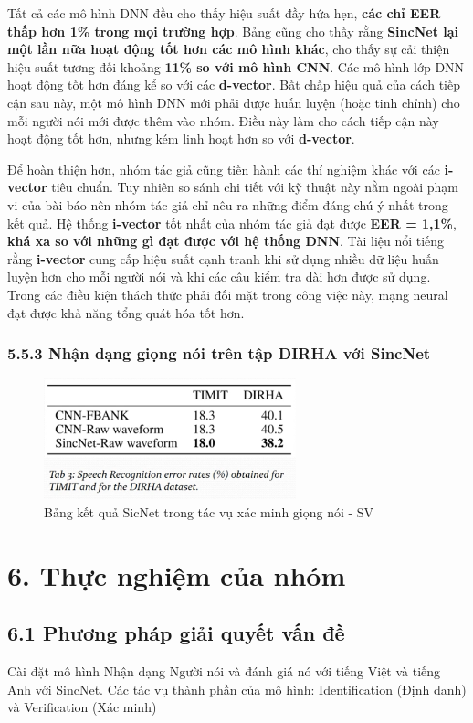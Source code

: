 \documentclass{article}
\begin{document}
	Tất cả các mô hình DNN đều cho thấy hiệu suất đầy hứa hẹn, \textbf{các chỉ EER thấp hơn 1\% trong mọi trường hợp}. Bảng cũng cho thấy rằng \textbf{SincNet lại một lần nữa hoạt động tốt hơn các mô hình khác}, cho thấy sự cải thiện hiệu suất tương đối khoảng \textbf{11\% so với mô hình CNN}. Các mô hình lớp DNN hoạt động tốt hơn đáng kể so với các \textbf{d-vector}. Bất chấp hiệu quả của cách tiếp cận sau này, một mô hình DNN mới phải được huấn luyện (hoặc tinh chỉnh) cho mỗi người nói mới được thêm vào nhóm. Điều này làm cho cách tiếp cận này hoạt động tốt hơn, nhưng kém linh hoạt hơn so với \textbf{d-vector}.
	
	Để hoàn thiện hơn, nhóm tác giả cũng tiến hành các thí nghiệm khác với các \textbf{i-vector} tiêu chuẩn. Tuy nhiên so sánh chi tiết với kỹ thuật này nằm ngoài phạm vi của bài báo nên nhóm tác giả chỉ nêu ra những điểm đáng chú ý nhất trong kết quả. Hệ thống \textbf{i-vector} tốt nhất của nhóm tác giả đạt được \textbf{EER = 1,1\%}, \textbf{khá xa so với những gì đạt được với hệ thống DNN}. Tài liệu nổi tiếng rằng \textbf{i-vector} cung cấp hiệu suất cạnh tranh khi sử dụng nhiều dữ liệu huấn luyện hơn cho mỗi người nói và khi các câu kiểm tra dài hơn được sử dụng. Trong các điều kiện thách thức phải đối mặt trong công việc này, mạng neural đạt được khả năng tổng quát hóa tốt hơn.

	\subsubsection{5.5.3 Nhận dạng giọng nói trên tập DIRHA với SincNet}
	\begin{figure}[H]
		\centering
		\includegraphics[width=0.65\textwidth]{images/sr_sincnet_result.png}
		\caption{Bảng kết quả SicNet trong tác vụ xác minh giọng nói - SV}
		\label{fig:writing-thesis}
	\end{figure}
	\section{6. Thực nghiệm của nhóm}
	\subsection{6.1 Phương pháp giải quyết vấn đề}
	Cài đặt mô hình Nhận dạng Người nói và đánh giá nó với tiếng Việt và tiếng Anh với SincNet.
	Các tác vụ thành phần của mô hình: Identification (Định danh) và Verification (Xác minh)
	
\end{document}
